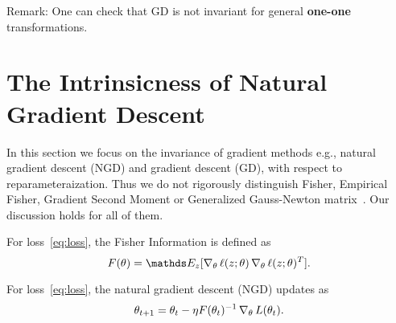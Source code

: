 \documentclass{article}
\begin{document}
Remark:
One can check that GD is not invariant for general \textbf{one-one} transformations.

\section{The Intrinsicness of Natural Gradient Descent}
In this section we focus on the invariance of gradient methods e.g., natural gradient descent (NGD) and gradient descent (GD), with respect to reparameteraization.
Thus we do not rigorously distinguish Fisher, Empirical Fisher, Gradient Second Moment or Generalized Gauss-Newton matrix~\cite{kunstner2019limitations,martens2014new}.
Our discussion holds for all of them.

\begin{defi}
For loss~\eqref{eq:loss}, the Fisher Information is defined as
\begin{equation}
    F(\theta) = \Ebb_{z} [\grad_{\theta}\ell(z;\theta) \grad_{\theta}\ell(z;\theta)^T].
\end{equation}
\end{defi}

\begin{defi}
For loss~\eqref{eq:loss}, the natural gradient descent (NGD) updates as~\cite{martens2014new}
\begin{equation}
    \theta_{t+1} = \theta_{t} - \eta F(\theta_t)^{-1} \operatorname{\nabla}_{\theta} L(\theta_t).
\end{equation}
\end{defi}
\end{document}
